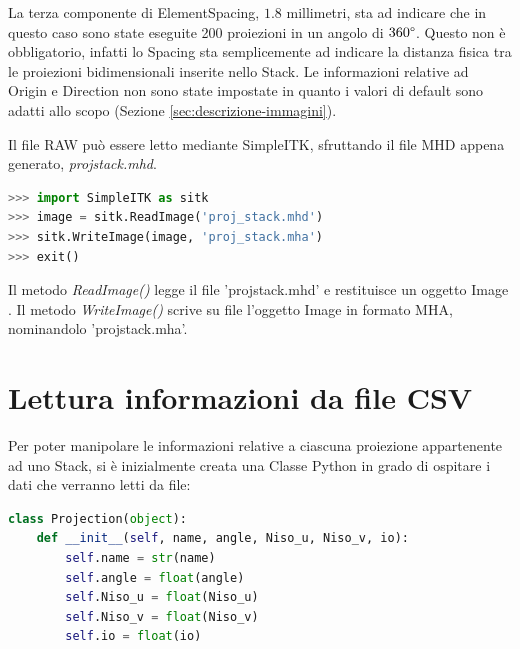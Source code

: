 \documentclass[a4paper,12pt, doubleside]{report}
\begin{document}
                    La terza componente di ElementSpacing, $1.8$ millimetri, sta ad indicare che in questo caso sono state eseguite 200 proiezioni in un angolo di $360\degree$. Questo non è obbligatorio, infatti lo Spacing sta semplicemente ad indicare la distanza fisica tra le proiezioni bidimensionali inserite nello Stack. Le informazioni relative ad Origin e Direction non sono state impostate in quanto i valori di default sono adatti allo scopo (Sezione \ref{sec:descrizione-immagini}).
                    
                \bigskip
                \par
                    Il file RAW può essere letto mediante SimpleITK, sfruttando il file MHD appena generato, \textit{proj\textunderscore stack.mhd}.
                   
                    \begin{lstlisting}[language=python, frame=bt]
>>> import SimpleITK as sitk
>>> image = sitk.ReadImage('proj_stack.mhd')
>>> sitk.WriteImage(image, 'proj_stack.mha')
>>> exit()
                    \end{lstlisting}
                    
                    Il metodo \textit{ReadImage()} legge il file 'proj\textunderscore stack.mhd' e restituisce un oggetto Image \cite{itk-image-object}. Il metodo \textit{WriteImage()} \cite{sitk-write-image} scrive su file l'oggetto Image in formato MHA, nominandolo 'proj\textunderscore stack.mha'. 
        
        \section{Lettura informazioni da file CSV}
            \label{sec:lettura-csv}
            
            \par
                Per poter manipolare le informazioni relative a ciascuna proiezione appartenente ad uno Stack, si è inizialmente creata una Classe Python in grado di ospitare i dati che verranno letti da file:
            
                \begin{lstlisting}[language=python, frame=bt]
class Projection(object):
    def __init__(self, name, angle, Niso_u, Niso_v, io):
        self.name = str(name)
        self.angle = float(angle)
        self.Niso_u = float(Niso_u)
        self.Niso_v = float(Niso_v)
        self.io = float(io)
                \end{lstlisting}
            
\end{document}
